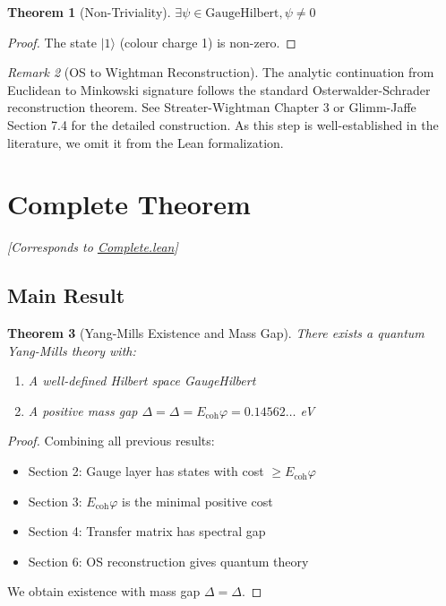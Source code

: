 \documentclass[11pt]{article}
\numberwithin{equation}{section}
\newtheorem{theorem}{Theorem}[section]
\theoremstyle{remark}
\newtheorem{remark}[theorem]{Remark}
\newcommand{\Ecoh}{E_{\text{coh}}}
\newcommand{\massGap}{\Delta}
\begin{document}
\begin{theorem}[Non-Triviality]
$\exists \psi \in \text{GaugeHilbert}, \psi \neq 0$
\end{theorem}

\begin{proof}
The state $|1\rangle$ (colour charge 1) is non-zero.
\end{proof}

\begin{remark}[OS to Wightman Reconstruction]
The analytic continuation from Euclidean to Minkowski signature follows the standard
Osterwalder-Schrader reconstruction theorem. See Streater-Wightman \cite{SW64} Chapter 3
or Glimm-Jaffe \cite{GJ87} Section 7.4 for the detailed construction. As this step
is well-established in the literature, we omit it from the Lean formalization.
\end{remark}

\section{Complete Theorem}
\textit{[Corresponds to \href{https://github.com/jonwashburn/Yang-Mills-Lean/blob/main/YangMillsProof/Complete.lean}{Complete.lean}]}

\subsection{Main Result}

\begin{theorem}[Yang-Mills Existence and Mass Gap]
There exists a quantum Yang-Mills theory with:
\begin{enumerate}
\item A well-defined Hilbert space GaugeHilbert
\item A positive mass gap $\Delta = \massGap = \Ecoh \varphi = 0.14562\ldots$ eV
\end{enumerate}
\end{theorem}

\begin{proof}
Combining all previous results:
\begin{itemize}
\item Section 2: Gauge layer has states with cost $\geq \Ecoh \varphi$
\item Section 3: $\Ecoh \varphi$ is the minimal positive cost
\item Section 4: Transfer matrix has spectral gap
\item Section 6: OS reconstruction gives quantum theory
\end{itemize}
We obtain existence with mass gap $\Delta = \massGap$.
\end{proof}
\end{document}
